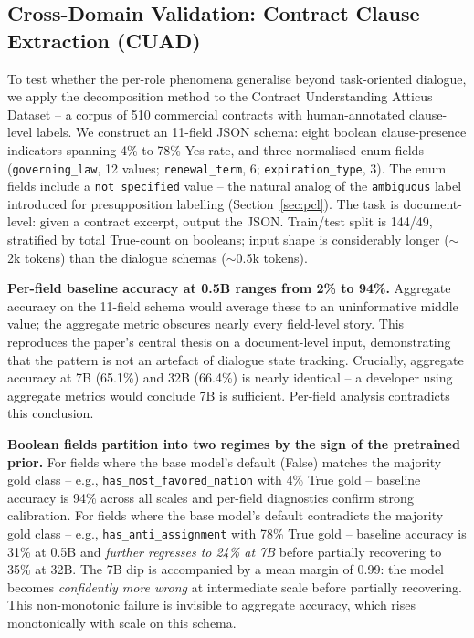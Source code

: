 \documentclass[11pt]{article}
\begin{document}
\subsection{Cross-Domain Validation: Contract Clause Extraction (CUAD)}\label{sec:cuad}

To test whether the per-role phenomena generalise beyond task-oriented dialogue, we apply the decomposition method to the Contract Understanding Atticus Dataset \cite{hendrycks2021cuad} -- a corpus of 510 commercial contracts with human-annotated clause-level labels. We construct an 11-field JSON schema: eight boolean clause-presence indicators spanning 4\% to 78\% Yes-rate, and three normalised enum fields (\texttt{governing\_law}, 12 values; \texttt{renewal\_term}, 6; \texttt{expiration\_type}, 3). The enum fields include a \texttt{not\_specified} value -- the natural analog of the \texttt{ambiguous} label introduced for presupposition labelling (Section~\ref{sec:pcl}). The task is document-level: given a contract excerpt, output the JSON. Train/test split is 144/49, stratified by total True-count on booleans; input shape is considerably longer ($\sim$2k tokens) than the dialogue schemas ($\sim$0.5k tokens).

\textbf{Per-field baseline accuracy at 0.5B ranges from 2\% to 94\%.} Aggregate accuracy on the 11-field schema would average these to an uninformative middle value; the aggregate metric obscures nearly every field-level story. This reproduces the paper's central thesis on a document-level input, demonstrating that the pattern is not an artefact of dialogue state tracking. Crucially, aggregate accuracy at 7B (65.1\%) and 32B (66.4\%) is nearly identical -- a developer using aggregate metrics would conclude 7B is sufficient. Per-field analysis contradicts this conclusion.

\textbf{Boolean fields partition into two regimes by the sign of the pretrained prior.} For fields where the base model's default (False) matches the majority gold class -- e.g., \texttt{has\_most\_favored\_nation} with 4\% True gold -- baseline accuracy is 94\% across all scales and per-field diagnostics confirm strong calibration. For fields where the base model's default contradicts the majority gold class -- e.g., \texttt{has\_anti\_assignment} with 78\% True gold -- baseline accuracy is 31\% at 0.5B and \emph{further regresses to 24\% at 7B} before partially recovering to 35\% at 32B. The 7B dip is accompanied by a mean margin of 0.99: the model becomes \emph{confidently more wrong} at intermediate scale before partially recovering. This non-monotonic failure is invisible to aggregate accuracy, which rises monotonically with scale on this schema.
\end{document}
